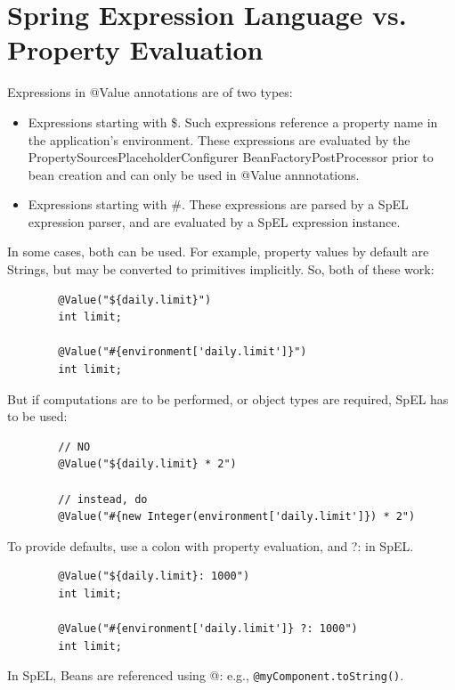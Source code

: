 \documentclass{scrartcl}
\begin{document}
\section{Spring Expression Language vs. Property Evaluation}

    Expressions in @Value annotations are of two types:

    \begin{itemize}
        \item Expressions starting with \$. Such expressions reference a property name in the application’s environment. These expressions are evaluated by the PropertySourcesPlaceholderConfigurer BeanFactoryPostProcessor prior to bean creation and can only be used in @Value annnotations.
        \item Expressions starting with \#.
        These expressions are parsed by a SpEL expression parser, and are evaluated by a SpEL expression instance.
    \end{itemize}

    In some cases, both can be used. For example, property values by default are Strings, but may be converted to primitives implicitly. So, both of these work:

    \begin{lstlisting}
        @Value("${daily.limit}")
        int limit;

        @Value("#{environment['daily.limit']}")
        int limit;
    \end{lstlisting}

    But if computations are to be performed, or object types are required, SpEL has to be used:

    \begin{lstlisting}
        // NO
        @Value("${daily.limit} * 2")

        // instead, do
        @Value("#{new Integer(environment['daily.limit']}) * 2")
    \end{lstlisting}

    To provide defaults, use a colon with property evaluation, and ?: in SpEL.

    \begin{lstlisting}
        @Value("${daily.limit}: 1000")
        int limit;

        @Value("#{environment['daily.limit']} ?: 1000")
        int limit;
    \end{lstlisting}

    In SpEL, Beans are referenced using @: e.g., \lstinline|@myComponent.toString()|.
\end{document}
